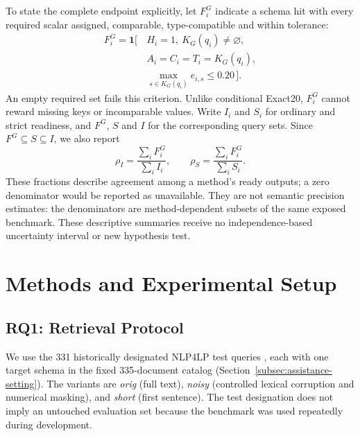 \documentclass[pdflatex,iicol,sn-basic,Numbered]{sn-jnl}
\begin{document}
To state the complete endpoint explicitly, let $F_i^G$ indicate a schema hit with every required scalar assigned, comparable, type-compatible and within tolerance:
\begin{equation}
\begin{split}
F_i^G=\mathbf{1}[\,&H_i=1,\ K_G(q_i)\ne\varnothing,\\
&A_i=C_i=T_i=K_G(q_i),\\
&\max_{s\in K_G(q_i)}e_{i,s}\leq0.20\,].
\end{split}\label{eq:full-scalar}
\end{equation}
An empty required set fails this criterion. Unlike conditional Exact20, $F_i^G$ cannot reward missing keys or incomparable values. Write $I_i$ and $S_i$ for ordinary and strict readiness, and $F^G$, $S$ and $I$ for the corresponding query sets. Since $F^G\subseteq S\subseteq I$, we also report
\begin{equation}
\rho_I=\frac{\sum_i F_i^G}{\sum_i I_i},\qquad
\rho_S=\frac{\sum_i F_i^G}{\sum_i S_i}.
\label{eq:conditional-agreement}
\end{equation}
These fractions describe agreement among a method's ready outputs; a zero denominator would be reported as unavailable. They are not semantic precision estimates: the denominators are method-dependent subsets of the same exposed benchmark. These descriptive summaries receive no independence-based uncertainty interval or new hypothesis test.

\section{Methods and Experimental Setup}
\label{sec:methodology}\label{sec:method}
\subsection{RQ1: Retrieval Protocol}
\label{subsec:method_retrieval}\label{subsec:exp_setup}
We use the 331 historically designated NLP4LP test queries \cite{nlp4lp_dataset,ahmaditeshnizi2024optimus_icml}, each with one target schema in the fixed 335-document catalog (Section~\ref{subsec:assistance-setting}). The variants are \emph{orig} (full text), \emph{noisy} (controlled lexical corruption and numerical masking), and \emph{short} (first sentence). The test designation does not imply an untouched evaluation set because the benchmark was used repeatedly during development.
\end{document}

